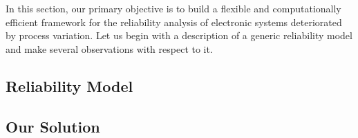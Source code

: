 In this section, our primary objective is to build a flexible and computationally efficient framework for the reliability analysis of electronic systems deteriorated by process variation.
Let us begin with a description of a generic reliability model and make several observations with respect to it.

\subsection{Reliability Model} 


\subsection{Our Solution} 



